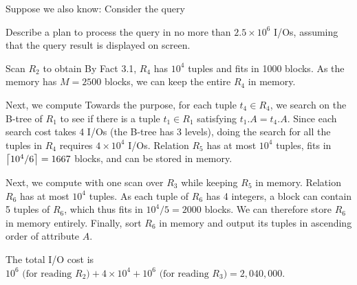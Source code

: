  Suppose we also know:
Consider the query



\noindent Describe a plan to process the query in no more than $2.5 \times 10^6$ I/Os, assuming that the query result is displayed on screen.


\begin{sol}
    Scan $R_2$ to obtain
    By Fact 3.1, $R_4$ has $10^4$ tuples and fits in 1000 blocks. As the memory has $M = 2500$ blocks, we can keep the entire $R_4$ in memory.

    \vgap

    Next, we compute
    Towards the purpose, for each tuple $t_4 \in R_4$, we search on the B-tree of $R_1$ to see if there is a tuple $t_1 \in R_1$ satisfying $t_1.A = t_4.A$. Since each search cost takes 4 I/Os (the B-tree has 3 levels), doing the search for all the tuples in $R_4$ requires $4 \times 10^4$ I/Os. Relation $R_5$ has at most $10^4$ tuples, fits in $\left \lceil 10^4 / 6 \right \rceil = 1667$ blocks, and can be stored in memory.

    \vgap

    Next, we compute
    with one scan over $R_3$ while keeping $R_5$ in memory. Relation $R_6$ has at most $10^4$ tuples. As each tuple of $R_6$ has 4 integers, a block can contain 5 tuples of $R_6$, which thus fits in $10^4 / 5 = 2000$ blocks. We can therefore store $R_6$ in memory entirely.
    Finally, sort $R_6$ in memory and output its tuples in ascending order of attribute $A$.

    \vgap

    The total I/O cost is $10^6 \text{ (for reading $R_2$)} + 4 \times 10^4 + 10^6 \text{ (for reading $R_3$)} = 2,040,000$.
\end{sol}

